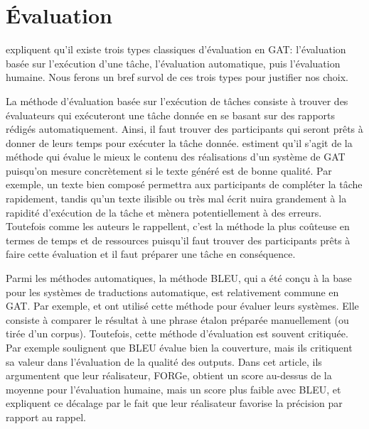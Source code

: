 
\chapter{Évaluation}\label{ch:eval}

\cite{ReiterInvestigationValidityMetrics2009} expliquent qu'il existe trois types classiques d'évaluation en \ac{GAT}: l'évaluation basée sur l'exécution d'une tâche, l'évaluation automatique, puis l'évaluation humaine. Nous ferons un bref survol de ces trois types pour justifier nos choix.

La méthode d'évaluation basée sur l'exécution de tâches consiste à trouver des évaluateurs qui exécuteront une tâche donnée en se basant sur des rapports rédigés automatiquement. Ainsi, il faut trouver des participants qui seront prêts à donner de leurs temps pour exécuter la tâche donnée. \cite{ReiterInvestigationValidityMetrics2009} estiment qu'il s'agit de la méthode qui évalue le mieux le contenu des réalisations d'un système de \ac{GAT} puisqu'on mesure concrètement si le texte généré est de bonne qualité. Par exemple, un texte bien composé permettra aux participants de compléter la tâche rapidement, tandis qu'un texte ilisible ou très mal écrit nuira grandement à la rapidité d'exécution de la tâche et mènera potentiellement à des erreurs. Toutefois comme les auteurs le rappellent, c'est la méthode la plus coûteuse en termes de temps et de ressources puisqu'il faut trouver des participants prêts à faire cette évaluation et il faut préparer une tâche en conséquence.

Parmi les méthodes automatiques, la méthode BLEU, qui a été conçu à la base pour les systèmes de traductions automatique, est relativement commune en \ac{GAT}. Par exemple, \cite{Langkilde-gearyForestbasedstatisticalsentence2000} et \cite{Habash2003MatadorAL} ont utilisé cette méthode pour évaluer leurs systèmes. Elle consiste à comparer le résultat à une phrase étalon préparée manuellement (ou tirée d'un corpus). Toutefois, cette méthode d'évaluation est souvent critiquée. Par exemple \cite{DBLP:conf/semeval/MilleCBW17} soulignent que BLEU évalue bien la couverture, mais ils critiquent sa valeur dans l'évaluation de la qualité des outputs. Dans cet article, ils argumentent que leur réalisateur, FORGe, obtient un score au-dessus de la moyenne pour l'évaluation humaine, mais un score plus faible avec BLEU, et expliquent ce décalage par le fait que leur réalisateur favorise la précision par rapport au rappel.

